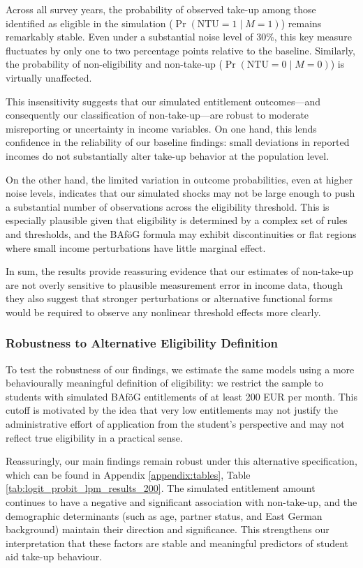 

Across all survey years, the probability of observed take-up among those identified as eligible in the simulation (\( \Pr(\mathrm{NTU}=1 \mid M=1) \)) remains remarkably stable. 
Even under a substantial noise level of 30\%, this key measure fluctuates by only one to two percentage points relative to the baseline. Similarly, the probability of non-eligibility and non-take-up (\( \Pr(\mathrm{NTU}=0 \mid M=0) \)) is virtually unaffected.

This insensitivity suggests that our simulated entitlement outcomes—and consequently our classification of non-take-up—are robust to moderate misreporting or uncertainty in income variables. 
On one hand, this lends confidence in the reliability of our baseline findings: small deviations in reported incomes do not substantially alter take-up behavior at the population level.

On the other hand, the limited variation in outcome probabilities, even at higher noise levels, indicates that our simulated shocks may not be large enough to push a substantial number of observations across the eligibility threshold. 
This is especially plausible given that eligibility is determined by a complex set of rules and thresholds, and the BAföG formula may exhibit discontinuities or flat regions where small income perturbations have little marginal effect.

In sum, the results provide reassuring evidence that our estimates of non-take-up are not overly sensitive to plausible measurement error in income data, though they also suggest that stronger perturbations or alternative functional forms would be required to observe any nonlinear threshold effects more clearly.

\subsubsection{Robustness to Alternative Eligibility Definition}
To test the robustness of our findings, we estimate the same models using a more behaviourally meaningful definition of eligibility: we restrict the sample to students with simulated BAföG entitlements of at least 200 EUR per month. 
This cutoff is motivated by the idea that very low entitlements may not justify the administrative effort of application from the student's perspective and may not reflect true eligibility in a practical sense.

Reassuringly, our main findings remain robust under this alternative specification, which can be found in Appendix \ref{appendix:tables}, Table \ref{tab:logit_probit_lpm_results_200}. 
The simulated entitlement amount continues to have a negative and significant association with non-take-up, and the demographic determinants (such as age, partner status, and East German background) maintain their direction and significance. 
This strengthens our interpretation that these factors are stable and meaningful predictors of student aid take-up behaviour.
